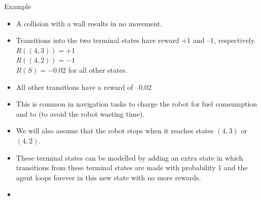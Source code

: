 \documentclass[handout]{beamer}
\begin{document}
\begin{frame}{Example}
\scriptsize{
\begin{itemize}
\item A collision with a wall results in no movement.

\item Transitions into the two terminal states have reward +1 and –1, respectively. \\
$R((4,3)) = +1$ \\
$R((4,2)) = -1$ \\
$R(S) = -0.02$ for all other states.

\item All other transitions have a reward of –0.02 
\item This is common in navigation tasks to charge the robot for fuel comsumption and to (to avoid the robot wasting time).

\item We will also assume that the robot stops when it reaches states $(4,3)$ or $(4,2)$.

\item These terminal states can be modelled by adding an extra state in which transitions from these terminal states are made with probability 1 and the agent loops forever in this new state with no more rewards.

\item 

\end{itemize}


} 

\end{frame}
\end{document}
